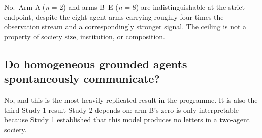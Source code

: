 \documentclass[pdflatex,sn-basic]{sn-jnl}
\begin{document}
No.~Arm A (\emph{n} = 2) and arms B--E (\emph{n} = 8) are indistinguishable at the strict endpoint,
despite the eight-agent arms carrying roughly four times the observation stream and a
correspondingly stronger signal. The ceiling is not a property of society size,
institution, or composition.

\hypertarget{do-homogeneous-grounded-agents-spontaneously-communicate}{%
\subsection{Do homogeneous grounded agents spontaneously communicate?}\label{do-homogeneous-grounded-agents-spontaneously-communicate}}

No, and this is the most heavily replicated result in the programme. It is also the third Study
1 result Study 2 depends on: arm B's zero is only interpretable because Study 1 established that
this model produces no letters in a two-agent society.
\end{document}
